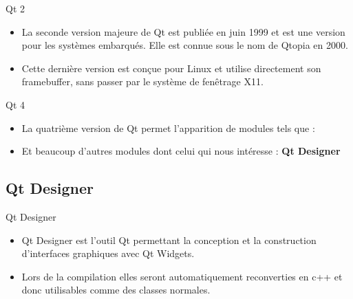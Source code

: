 \documentclass{beamer}
\begin{document}
\begin{frame}{Qt 2}
  \begin{itemize}
    \item {
        La seconde version majeure de Qt est publiée en juin 1999 et est une version pour les systèmes embarqués. Elle est connue sous le nom de Qtopia en 2000.
    \pause
    }
    \item {
         Cette dernière version est conçue pour Linux et utilise directement son framebuffer, sans passer par le système de fenêtrage X11.
    }
    \end{itemize}
\end{frame}

\begin{frame}{Qt 4}
  \begin{itemize}
    \item {
        La quatrième version de Qt permet l'apparition de modules tels que : 
    }
    
     \pause

    \item {
        Et beaucoup d'autres modules dont celui qui nous intéresse : \textbf{Qt Designer}
    }
    \end{itemize}
\end{frame}


\subsection{Qt Designer}

\begin{frame}{Qt Designer}
  \begin{itemize}
    \item {
        Qt Designer est l'outil Qt permettant la conception et la construction d'interfaces graphiques avec Qt Widgets.
    \pause
   }
    \item{
        Lors de la compilation elles seront automatiquement reconverties en c++ et donc utilisables comme des classes normales.
    }
    
    \end{itemize}
\end{frame}
    
\end{document}
